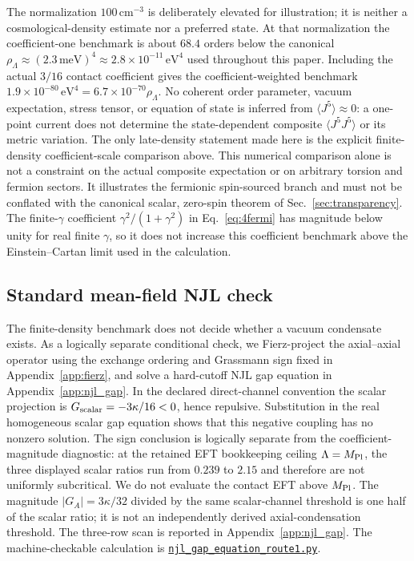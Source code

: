\documentclass[aps,prd,twocolumn,superscriptaddress,preprintnumbers,nofootinbib,longbibliography,floatfix]{revtex4-2}
\newcommand{\artifactnamed}[2]{\href{https://github.com/Hubify-Projects/bigbounce/blob/7befce143848b925998a3e6ecc850aa510ab3a94/#1}{\nolinkurl{#2}}}
\begin{document}
The normalization $100\,\mathrm{cm}^{-3}$ is deliberately elevated for
illustration; it is neither a cosmological-density estimate nor a preferred
state.  At that normalization the coefficient-one benchmark is about $68.4$
orders below the canonical
$\rho_\Lambda\approx (2.3\,\text{meV})^4 \approx 2.8\times 10^{-11}\,\text{eV}^4$
used throughout this paper.  Including the actual $3/16$ contact coefficient
gives the coefficient-weighted benchmark
$1.9\times10^{-80}\,\text{eV}^4=6.7\times10^{-70}\rho_\Lambda$.
No coherent order parameter, vacuum expectation, stress tensor, or equation of
state is inferred from $\langle J^5\rangle\approx0$: a one-point current does
not determine the state-dependent composite $\langle J^5J^5\rangle$ or its
metric variation.  The only late-density statement made here is the explicit
finite-density coefficient-scale comparison above.
This numerical comparison alone is not a constraint on the actual composite
expectation or on arbitrary torsion and fermion sectors.  It illustrates the
fermionic spin-sourced branch and must not be conflated with the canonical
scalar, zero-spin theorem of Sec.~\ref{sec:transparency}.  The finite-$\gamma$ coefficient
$\gamma^2/(1+\gamma^2)$ in Eq.~\eqref{eq:4fermi} has magnitude below unity for
real finite $\gamma$, so it does not increase this coefficient benchmark above
the Einstein--Cartan limit used in the calculation.

\subsection{Standard mean-field NJL check}

The finite-density benchmark does not decide whether a vacuum condensate
exists.  As a logically separate conditional check, we Fierz-project the
axial--axial operator using the exchange ordering and Grassmann sign fixed in
Appendix~\ref{app:fierz}, and solve a
hard-cutoff NJL gap equation in Appendix~\ref{app:njl_gap}.  In the declared
direct-channel convention the scalar projection is
$G_{\rm scalar}=-3\kappa/16<0$, hence repulsive.  Substitution in the real
homogeneous scalar gap equation shows that this negative coupling has no
nonzero solution.  The sign conclusion is logically separate from the
coefficient-magnitude diagnostic: at the retained EFT bookkeeping ceiling
$\Lambda=M_{\rm Pl}$, the three displayed scalar ratios run from $0.239$ to
$2.15$ and therefore are not uniformly subcritical.  We do not evaluate the
contact EFT above $M_{\rm Pl}$.  The magnitude $|G_A|=3\kappa/32$ divided by
the same scalar-channel threshold is one half of the scalar ratio; it is not
an independently derived axial-condensation threshold.  The three-row scan is
reported in Appendix~\ref{app:njl_gap}.
The machine-checkable calculation is
\artifactnamed{arxiv/scripts/njl_gap_equation_route1.py}{njl_gap_equation_route1.py}.
\end{document}
